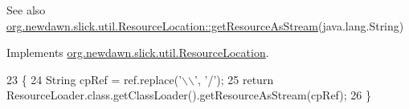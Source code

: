\begin{DoxySeeAlso}{See also}
\mbox{\hyperlink{interfaceorg_1_1newdawn_1_1slick_1_1util_1_1_resource_location_a484bade425ef16b2230d28701b2c5e2f}{org.\+newdawn.\+slick.\+util.\+Resource\+Location\+::get\+Resource\+As\+Stream}}(java.\+lang.\+String) 
\end{DoxySeeAlso}


Implements \mbox{\hyperlink{interfaceorg_1_1newdawn_1_1slick_1_1util_1_1_resource_location_a484bade425ef16b2230d28701b2c5e2f}{org.\+newdawn.\+slick.\+util.\+Resource\+Location}}.


\begin{DoxyCode}
23                                                        \{
24         String cpRef = ref.replace(\textcolor{charliteral}{'\(\backslash\)\(\backslash\)'}, \textcolor{charliteral}{'/'});
25         \textcolor{keywordflow}{return} ResourceLoader.class.getClassLoader().getResourceAsStream(cpRef);    
26     \}
\end{DoxyCode}
